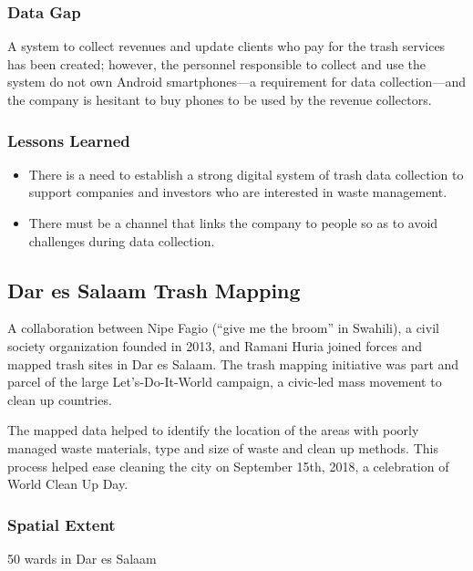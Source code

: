 \documentclass[a4paper,12pt,twoside]{article}
\begin{document}
\subsubsection{Data Gap}
A system to collect revenues and update clients who pay for the trash services has been created; however, the personnel responsible to collect and use the system do not own Android smartphones---a requirement for data collection---and the company is hesitant to buy phones to be used by the revenue collectors.

\subsubsection{Lessons Learned}
\begin{itemize}
    \item There is a need to establish  a strong digital system of trash data collection to support companies and investors who are interested in waste management.
    \item There must be a channel that links the company to people so as to avoid challenges during data collection.
\end{itemize}

\newpage
\subsection{Dar es Salaam Trash Mapping}
A collaboration between Nipe Fagio (“give me the broom” in Swahili), a civil society organization founded in 2013, and Ramani Huria joined forces and mapped trash sites in Dar es Salaam. The trash mapping initiative was part and parcel of the large Let’s-Do-It-World campaign, a civic-led mass movement to clean up countries.

The mapped data helped to identify the location of the areas with poorly managed waste materials, type and size of waste and clean up methods. This process helped ease cleaning the city on September 15th, 2018, a celebration of World Clean Up Day.

\subsubsection{Spatial Extent}
50 wards in Dar es Salaam
\end{document}
